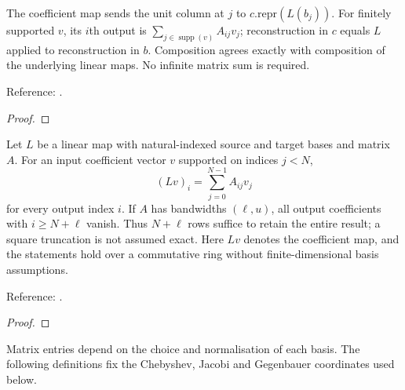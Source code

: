 \begin{theorem}
\label{thm:operator-coefficients}
\leanok
The coefficient map sends the unit column at $j$ to $c.\mathrm{repr}(L(b_j))$.
For finitely supported $v$, its $i$th output is
$\sum_{j\in\operatorname{supp}(v)} A_{ij}v_j$; reconstruction in $c$ equals
$L$ applied to reconstruction in $b$. Composition agrees exactly with
composition of the underlying linear maps. No infinite matrix sum is required.

Reference: \cite[\S2]{olver-townsend}.
\end{theorem}
\begin{proof}
\leanok
\end{proof}

\begin{theorem}
\label{thm:finite-operator-sections}
\leanok
Let $L$ be a linear map with natural-indexed source and target bases and matrix
$A$. For an input coefficient vector $v$ supported on indices $j<N$,
\[
 (Lv)_i=\sum_{j=0}^{N-1}A_{ij}v_j
\]
for every output index $i$. If $A$ has bandwidths $(\ell,u)$, all output
coefficients with $i\ge N+\ell$ vanish. Thus $N+\ell$ rows suffice to retain
the entire result; a square truncation is not assumed exact.
Here $Lv$ denotes the coefficient map, and the statements hold over a
commutative ring without finite-dimensional basis assumptions.

Reference: \cite[Section 3]{olver-townsend}.
\end{theorem}
\begin{proof}
\leanok
\end{proof}

Matrix entries depend on the choice and normalisation of each basis.
The following definitions fix the Chebyshev, Jacobi and Gegenbauer coordinates
used below.

